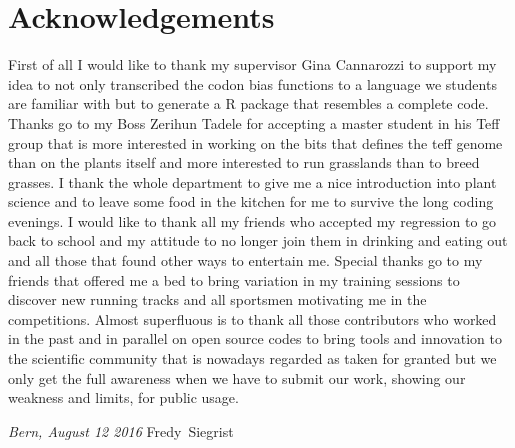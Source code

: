 \chapter*{Acknowledgements}
First of all I would like to thank my supervisor Gina Cannarozzi to support my idea to not only transcribed the codon bias functions to a language we students are familiar with but to generate a R package that resembles a complete code. Thanks go to my Boss Zerihun Tadele for accepting a master student in his Teff group that is more interested in working on the bits that defines the teff genome than on the plants itself and more interested to run grasslands than to breed grasses. I thank the whole department to give me a nice introduction into plant science and to leave some food in the kitchen for me to survive the long coding evenings. I would like to thank all my friends who accepted my regression to go back to school and my attitude to no longer join them in drinking and eating out and all those that found other ways to entertain me. Special thanks go to my friends that offered me a bed to bring variation in my training sessions to discover new running tracks and all sportsmen motivating me in the competitions. Almost superfluous is to thank all those contributors who worked in the past and in parallel on open source codes to bring tools and innovation to the scientific community that is nowadays regarded as taken for granted but we only get the full awareness when we have to submit our work, showing our weakness and limits, for public usage.
\bigskip
 
\noindent\textit{Bern, August 12 2016}
\hfill Fredy~Siegrist

